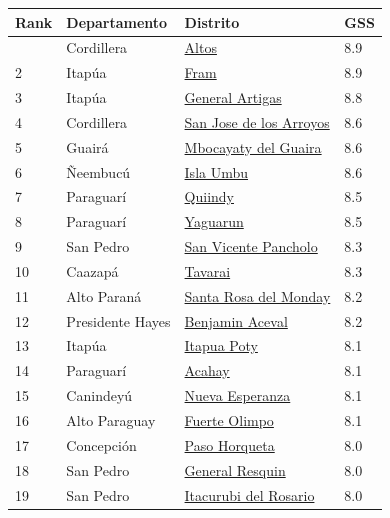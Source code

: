 {\def\LTcaptype{none} %
\begin{longtable}[]{@{}llll@{}}
\toprule\noalign{}
Rank & Departamento & Distrito & GSS \\
\midrule\noalign{}
\endhead
\bottomrule\noalign{}
\endlastfoot
1 & Cordillera & \hyperref[dist:03_Cordillera:Altos]{Altos} & 8.9 \\
2 & Itapúa & \hyperref[dist:07_Itapua:Fram]{Fram} & 8.9 \\
3 & Itapúa & \hyperref[dist:07_Itapua:General_Artigas]{General Artigas} & 8.8 \\
4 & Cordillera & \hyperref[dist:03_Cordillera:San_Jose_de_los_Arroyos]{San Jose de los Arroyos} & 8.6 \\
5 & Guairá & \hyperref[dist:04_Guaira:Mbocayaty_del_Guaira]{Mbocayaty del Guaira} & 8.6 \\
6 & Ñeembucú & \hyperref[dist:12_Neembucu:Isla_Umbu]{Isla Umbu} & 8.6 \\
7 & Paraguarí & \hyperref[dist:09_Paraguari:Quiindy]{Quiindy} & 8.5 \\
8 & Paraguarí & \hyperref[dist:09_Paraguari:Yaguarun]{Yaguarun} & 8.5 \\
9 & San Pedro & \hyperref[dist:02_San_Pedro:San_Vicente_Pancholo]{San Vicente Pancholo} & 8.3 \\
10 & Caazapá & \hyperref[dist:06_Caazapa:Tavarai]{Tavarai} & 8.3 \\
11 & Alto Paraná & \hyperref[dist:10_Alto_Parana:Santa_Rosa_del_Monday]{Santa Rosa del Monday} & 8.2 \\
12 & Presidente Hayes & \hyperref[dist:15_Presidente_Hayes:Benjamin_Aceval]{Benjamin Aceval} & 8.2 \\
13 & Itapúa & \hyperref[dist:07_Itapua:Itapua_Poty]{Itapua Poty} & 8.1 \\
14 & Paraguarí & \hyperref[dist:09_Paraguari:Acahay]{Acahay} & 8.1 \\
15 & Canindeyú & \hyperref[dist:14_Canindeyu:Nueva_Esperanza]{Nueva Esperanza} & 8.1 \\
16 & Alto Paraguay & \hyperref[dist:17_Alto_Paraguay:Fuerte_Olimpo]{Fuerte Olimpo} & 8.1 \\
17 & Concepción & \hyperref[dist:01_Concepción:Paso_Horqueta]{Paso Horqueta} & 8.0 \\
18 & San Pedro & \hyperref[dist:02_San_Pedro:General_Resquin]{General Resquin} & 8.0 \\
19 & San Pedro & \hyperref[dist:02_San_Pedro:Itacurubi_del_Rosario]{Itacurubi del Rosario} & 8.0 \\

\end{longtable}}
